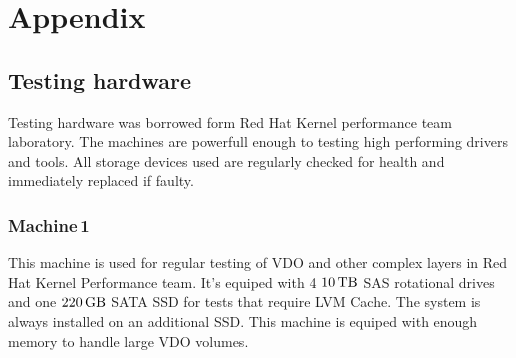 \documentclass[
  color, %
  table, %
  lof,   %
  lot,   %
]{fithesis3}
\begin{document}





\chapter{Appendix}
\section{Testing hardware}
\label{hardware}
Testing hardware was borrowed form Red Hat Kernel performance team laboratory. The machines are powerfull enough to testing high performing drivers and tools. All storage devices used are regularly checked for health and immediately replaced if faulty.


\subsection{Machine\,1}
\label{hw:1}
This machine is used for regular testing of VDO and other complex layers in Red Hat Kernel Performance team. It's equiped with 4 $\SI{10}{\tera\byte}$ SAS rotational drives and one $\SI{220}{\giga\byte}$ SATA SSD for tests that require LVM Cache. The system is always installed on an additional SSD. This machine is equiped with enough memory to handle large VDO volumes.
\end{document}
